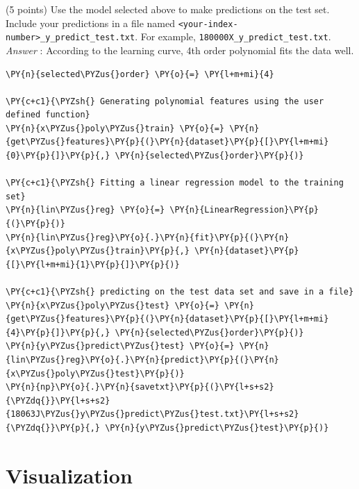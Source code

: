 \documentclass[a4paper,11pt]{article}%
\begin{document}
(5 points) Use the model selected above to make predictions on the test
set. Include your predictions in a file named
\texttt{\textless{}your-index-number\textgreater{}\_y\_predict\_test.txt}.
For example, \texttt{180000X\_y\_predict\_test.txt}.\\

\emph{Answer} : According to the learning curve, 4th order polynomial
fits the data well.

    \begin{tcolorbox}[breakable, size=fbox, boxrule=1pt, pad at break*=1mm,colback=cellbackground, colframe=cellborder]
\begin{Verbatim}[commandchars=\\\{\}]
\PY{n}{selected\PYZus{}order} \PY{o}{=} \PY{l+m+mi}{4}

\PY{c+c1}{\PYZsh{} Generating polynomial features using the user defined function}
\PY{n}{x\PYZus{}poly\PYZus{}train} \PY{o}{=} \PY{n}{get\PYZus{}features}\PY{p}{(}\PY{n}{dataset}\PY{p}{[}\PY{l+m+mi}{0}\PY{p}{]}\PY{p}{,} \PY{n}{selected\PYZus{}order}\PY{p}{)}

\PY{c+c1}{\PYZsh{} Fitting a linear regression model to the training set}
\PY{n}{lin\PYZus{}reg} \PY{o}{=} \PY{n}{LinearRegression}\PY{p}{(}\PY{p}{)}
\PY{n}{lin\PYZus{}reg}\PY{o}{.}\PY{n}{fit}\PY{p}{(}\PY{n}{x\PYZus{}poly\PYZus{}train}\PY{p}{,} \PY{n}{dataset}\PY{p}{[}\PY{l+m+mi}{1}\PY{p}{]}\PY{p}{)}

\PY{c+c1}{\PYZsh{} predicting on the test data set and save in a file}
\PY{n}{x\PYZus{}poly\PYZus{}test} \PY{o}{=} \PY{n}{get\PYZus{}features}\PY{p}{(}\PY{n}{dataset}\PY{p}{[}\PY{l+m+mi}{4}\PY{p}{]}\PY{p}{,} \PY{n}{selected\PYZus{}order}\PY{p}{)}
\PY{n}{y\PYZus{}predict\PYZus{}test} \PY{o}{=} \PY{n}{lin\PYZus{}reg}\PY{o}{.}\PY{n}{predict}\PY{p}{(}\PY{n}{x\PYZus{}poly\PYZus{}test}\PY{p}{)}
\PY{n}{np}\PY{o}{.}\PY{n}{savetxt}\PY{p}{(}\PY{l+s+s2}{\PYZdq{}}\PY{l+s+s2}{18063J\PYZus{}y\PYZus{}predict\PYZus{}test.txt}\PY{l+s+s2}{\PYZdq{}}\PY{p}{,} \PY{n}{y\PYZus{}predict\PYZus{}test}\PY{p}{)}
\end{Verbatim}
\end{tcolorbox}
\pagebreak
    \hypertarget{visualization}{%
\section{Visualization}\label{visualization}}
\end{document}
